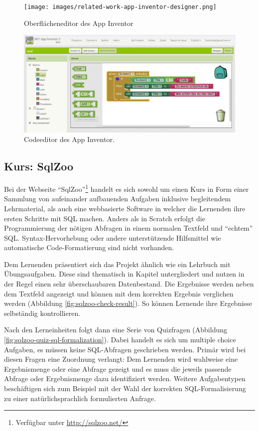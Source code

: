 \begin{figure}[p]
  \centering \texttt{[image: images/related-work-app-inventor-designer.png]}
  \caption{Oberflächeneditor des App Inventor}
  \label{fig:app-inventor-ui-designer}
\end{figure}

\begin{figure}[p]
  \centering \includegraphics[width=\textwidth]{images/related-work-app-inventor-blocks.png}
  \caption{Codeeditor des App Inventor.}
  \label{fig:app-inventor-block-designer}
\end{figure}

\subsection{Kurs: SqlZoo}

Bei der Webseite "`SqlZoo"'\footnote{Verfügbar unter \url{http://sqlzoo.net/}} handelt es sich sowohl um einen Kurs in Form einer Sammlung von aufeinander aufbauenden Aufgaben inklusive begleitendem Lehrmaterial, als auch eine webbasierte Software in welcher die Lernenden ihre ersten Schritte mit SQL machen. Anders als in Scratch erfolgt die Programmierung der nötigen Abfragen in einem normalen Textfeld und "`echtem"' SQL. Syntax-Hervorhebung oder andere unterstützende Hilfsmittel wie automatische Code-Formatierung sind nicht vorhanden.

Dem Lernenden präsentiert sich das Projekt ähnlich wie ein Lehrbuch mit Übungsaufgaben. Diese sind thematisch in Kapitel untergliedert und nutzen in der Regel einen sehr überschaubaren Datenbestand. Die Ergebnisse werden neben dem Textfeld angezeigt und können mit dem korrekten Ergebnis verglichen werden (Abbildung \ref{fig:sqlzoo-check-result}). So können Lernende ihre Ergebnisse selbständig kontrollieren.

Nach den Lerneinheiten folgt dann eine Serie von Quizfragen (Abbildung \ref{fig:sqlzoo-quiz-sql-formalization}). Dabei handelt es sich um multiple choice Aufgaben, es müssen keine SQL-Abfragen geschrieben werden. Primär wird bei diesen Fragen eine Zuordnung verlangt: Dem Lernenden wird wahlweise eine Ergebnismenge oder eine Abfrage gezeigt und es muss die jeweils passende Abfrage oder Ergebnismenge dazu identifiziert werden. Weitere Aufgabentypen beschäftigen sich zum Beispiel mit der Wahl der korrekten SQL-Formalisierung zu einer natürlichsprachlich formulierten Anfrage.


